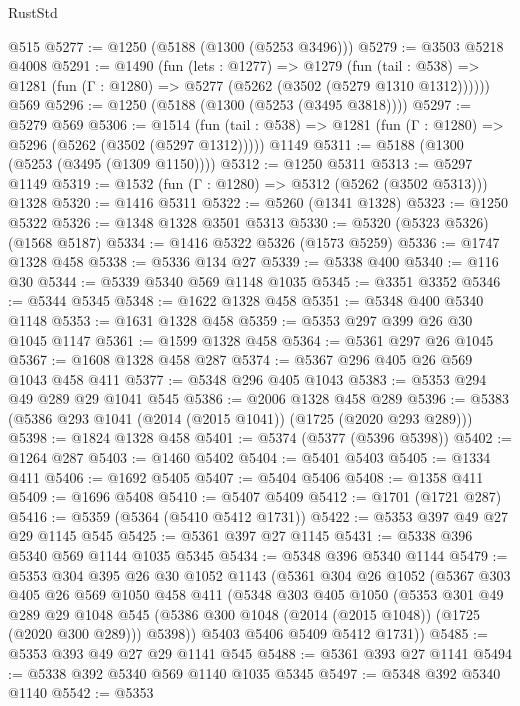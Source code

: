 \begin{lexlean}{RustStd}
\begin{coremodule}
    @515
@5277 := @1250 (@5188 (@1300 (@5253 @3496)))
@5279 := @3503 @5218 @4008
@5291 := @1490
    (fun (lets : @1277) =>
    @1279
      (fun (tail : @538) => @1281 (fun (Γ : @1280) => @5277 (@5262 (@3502 (@5279 @1310 @1312))))))
    @569
@5296 := @1250 (@5188 (@1300 (@5253 (@3495 @3818))))
@5297 := @5279 @569
@5306 := @1514
    (fun (tail : @538) => @1281 (fun (Γ : @1280) => @5296 (@5262 (@3502 (@5297 @1312)))))
    @1149
@5311 := @5188 (@1300 (@5253 (@3495 (@1309 @1150))))
@5312 := @1250 @5311
@5313 := @5297 @1149
@5319 := @1532 (fun (Γ : @1280) => @5312 (@5262 (@3502 @5313))) @1328
@5320 := @1416 @5311
@5322 := @5260 (@1341 @1328)
@5323 := @1250 @5322
@5326 := @1348 @1328 @3501 @5313
@5330 := @5320 (@5323 @5326) (@1568 @5187)
@5334 := @1416 @5322 @5326 (@1573 @5259)
@5336 := @1747 @1328 @458
@5338 := @5336 @134 @27
@5339 := @5338 @400
@5340 := @116 @30
@5344 := @5339 @5340 @569 @1148 @1035
@5345 := @3351 @3352
@5346 := @5344 @5345
@5348 := @1622 @1328 @458
@5351 := @5348 @400 @5340 @1148
@5353 := @1631 @1328 @458
@5359 := @5353 @297 @399 @26 @30 @1045 @1147
@5361 := @1599 @1328 @458
@5364 := @5361 @297 @26 @1045
@5367 := @1608 @1328 @458 @287
@5374 := @5367 @296 @405 @26 @569 @1043 @458 @411
@5377 := @5348 @296 @405 @1043
@5383 := @5353 @294 @49 @289 @29 @1041 @545
@5386 := @2006 @1328 @458 @289
@5396 := @5383 (@5386 @293 @1041 (@2014 (@2015 @1041)) (@1725 (@2020 @293 @289)))
@5398 := @1824 @1328 @458
@5401 := @5374 (@5377 (@5396 @5398))
@5402 := @1264 @287
@5403 := @1460 @5402
@5404 := @5401 @5403
@5405 := @1334 @411
@5406 := @1692 @5405
@5407 := @5404 @5406
@5408 := @1358 @411
@5409 := @1696 @5408
@5410 := @5407 @5409
@5412 := @1701 (@1721 @287)
@5416 := @5359 (@5364 (@5410 @5412 @1731))
@5422 := @5353 @397 @49 @27 @29 @1145 @545
@5425 := @5361 @397 @27 @1145
@5431 := @5338 @396 @5340 @569 @1144 @1035 @5345
@5434 := @5348 @396 @5340 @1144
@5479 := @5353
    @304
    @395
    @26
    @30
    @1052
    @1143
    (@5361
      @304
      @26
      @1052
      (@5367
        @303
        @405
        @26
        @569
        @1050
        @458
        @411
        (@5348
          @303
          @405
          @1050
          (@5353
            @301
            @49
            @289
            @29
            @1048
            @545
            (@5386 @300 @1048 (@2014 (@2015 @1048)) (@1725 (@2020 @300 @289)))
            @5398))
        @5403
        @5406
        @5409
        @5412
        @1731))
@5485 := @5353 @393 @49 @27 @29 @1141 @545
@5488 := @5361 @393 @27 @1141
@5494 := @5338 @392 @5340 @569 @1140 @1035 @5345
@5497 := @5348 @392 @5340 @1140
@5542 := @5353

\end{coremodule}
\end{lexlean}
